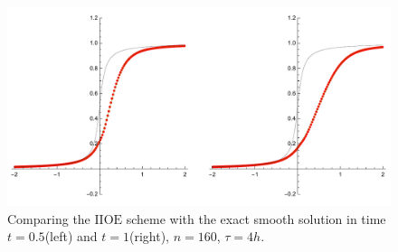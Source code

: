 \documentclass[../include.tex]{subfiles}
\begin{document}
\begin{figure}[H]
	\centering
	\includegraphics[width=\textwidth]{figures/invBurgSmooth160c4}
	\caption{Comparing the $\mathrm{IIOE}$ scheme with the exact smooth solution in time $ t=0.5 $(left) and $ t=1 $(right), $ n=160 $, $ \tau=4h $.}
	\label{fig:fliioe_burg_smooth}
\end{figure}
\end{document}
